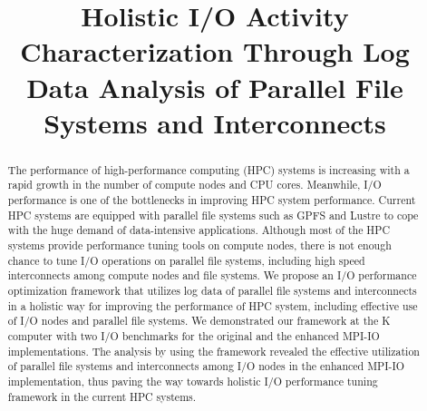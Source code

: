 \documentclass{jhps}
\begin{document}



\title{Holistic I/O Activity Characterization Through Log Data Analysis of Parallel File Systems and Interconnects}


\maketitle

\begin{abstract}
The performance of high-performance computing (HPC) systems is increasing
with a rapid growth in the number of compute nodes and CPU cores.
Meanwhile, I/O performance is one of the bottlenecks in improving HPC system performance.
Current HPC systems are equipped with parallel file systems such as GPFS and Lustre
to cope with the huge demand of data-intensive applications.
Although most of the HPC systems provide performance tuning tools on compute nodes,
there is not enough chance to tune I/O operations on parallel file systems,
including high speed interconnects among compute nodes and file systems.
We propose an I/O performance optimization framework that utilizes log data of
parallel file systems and interconnects in a holistic way
for improving the performance of HPC system, including effective use
of I/O nodes and parallel file systems.
We demonstrated our framework at the K computer with two I/O benchmarks
for the original and the enhanced MPI-IO implementations.
The analysis by using the framework revealed the effective utilization of
parallel file systems and interconnects among I/O nodes
in the enhanced MPI-IO implementation,
thus paving the way towards holistic I/O performance tuning framework
in the current HPC systems.
\end{abstract}
\end{document}
